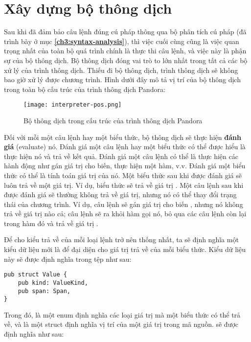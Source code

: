 \section{Xây dựng bộ thông dịch}
\label{ch3:interpreter}

    Sau khi đã đảm bảo câu lệnh đúng cú pháp thông qua bộ phân tích cú pháp (đã trình bày ở mục \textbf{\ref{ch3:syntax-analysis}}), thì việc cuối cùng cũng là việc quan trọng nhất của toàn bộ quá trình chính là thực thi câu lệnh, và việc này là phận sự của bộ thông dịch. Bộ thông dịch đóng vai trò to lớn nhất trong tất cả các bộ xử lý của trình thông dịch. Thiếu đi bộ thông dịch, trình thông dịch sẽ không bao giờ xử lý được chương trình. Hình dưới đây mô tả vị trí của bộ thông dịch trong toàn bộ cấu trúc của trình thông dịch Pandora:

\begin{figure}[H]
    \centering
    \texttt{[image: interpreter-pos.png]}
    \caption{Bộ thông dịch trong cấu trúc của trình thông dịch Pandora}
\end{figure}

    Đối với mỗi một câu lệnh hay một biểu thức, bộ thông dịch sẽ thực hiện \textbf{đánh giá} (evaluate) nó. Đánh giá một câu lệnh hay một biểu thức có thể được hiểu là thực hiện nó và trả về kết quả. Đánh giá một câu lệnh có thể là thực hiện các hành động như gán giá trị cho biến, thực hiện một hàm, v.v. Đánh giá một biểu thức có thể là tính toán giá trị của nó. Một biểu thức sau khi được đánh giá sẽ luôn trả về một giá trị. Ví dụ, biểu thức  sẽ trả về giá trị . Một câu lệnh sau khi được đánh giá sẽ thường không trả về giá trị, nhưng nó có thể thay đổi trạng thái của chương trình. Ví dụ, câu lệnh  sẽ gán giá trị  cho biến , nhưng nó không trả về giá trị nào cả; câu lệnh  sẽ ra khỏi hàm gọi nó, bỏ qua các câu lệnh còn lại trong hàm đó và trả về giá trị . 

    Để cho kiểu trả về của mỗi loại lệnh trở nên thống nhất, ta sẽ định nghĩa một kiểu dữ liệu mới là  để đại diện cho giá trị trả về của mỗi biểu thức. Kiểu dữ liệu này sẽ được định nghĩa trong tệp  như sau:

\begin{lstlisting}[]
pub struct Value {
    pub kind: ValueKind,
    pub span: Span,
}
\end{lstlisting}

    Trong đó,  là một enum định nghĩa các loại giá trị mà một biểu thức có thể trả về, và  là một struct định nghĩa vị trí của một giá trị trong mã nguồn.  sẽ được định nghĩa như sau:

